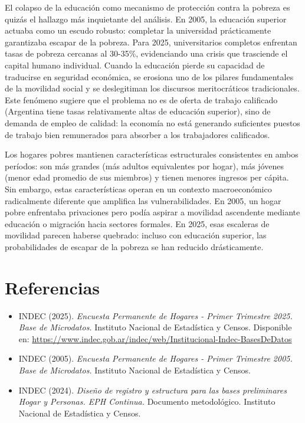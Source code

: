 \documentclass[11pt,a4paper]{article}
\begin{document}
El colapso de la educación como mecanismo de protección contra la pobreza es quizás el hallazgo más inquietante del análisis. En 2005, la educación superior actuaba como un escudo robusto: completar la universidad prácticamente garantizaba escapar de la pobreza. Para 2025, universitarios completos enfrentan tasas de pobreza cercanas al 30-35\%, evidenciando una crisis que trasciende el capital humano individual. Cuando la educación pierde su capacidad de traducirse en seguridad económica, se erosiona uno de los pilares fundamentales de la movilidad social y se deslegitiman los discursos meritocráticos tradicionales. Este fenómeno sugiere que el problema no es de oferta de trabajo calificado (Argentina tiene tasas relativamente altas de educación superior), sino de demanda de empleo de calidad: la economía no está generando suficientes puestos de trabajo bien remunerados para absorber a los trabajadores calificados.

Los hogares pobres mantienen características estructurales consistentes en ambos períodos: son más grandes (más adultos equivalentes por hogar), más jóvenes (menor edad promedio de sus miembros) y tienen menores ingresos per cápita. Sin embargo, estas características operan en un contexto macroeconómico radicalmente diferente que amplifica las vulnerabilidades. En 2005, un hogar pobre enfrentaba privaciones pero podía aspirar a movilidad ascendente mediante educación o migración hacia sectores formales. En 2025, esas escaleras de movilidad parecen haberse quebrado: incluso con educación superior, las probabilidades de escapar de la pobreza se han reducido drásticamente.

\section{Referencias}

\begin{itemize}
\item INDEC (2025). \textit{Encuesta Permanente de Hogares - Primer Trimestre 2025. Base de Microdatos.} Instituto Nacional de Estadística y Censos. Disponible en: \url{https://www.indec.gob.ar/indec/web/Institucional-Indec-BasesDeDatos}

\item INDEC (2005). \textit{Encuesta Permanente de Hogares - Primer Trimestre 2005. Base de Microdatos.} Instituto Nacional de Estadística y Censos.

\item INDEC (2024). \textit{Diseño de registro y estructura para las bases preliminares Hogar y Personas. EPH Continua.} Documento metodológico. Instituto Nacional de Estadística y Censos.

\end{itemize}
\end{document}
